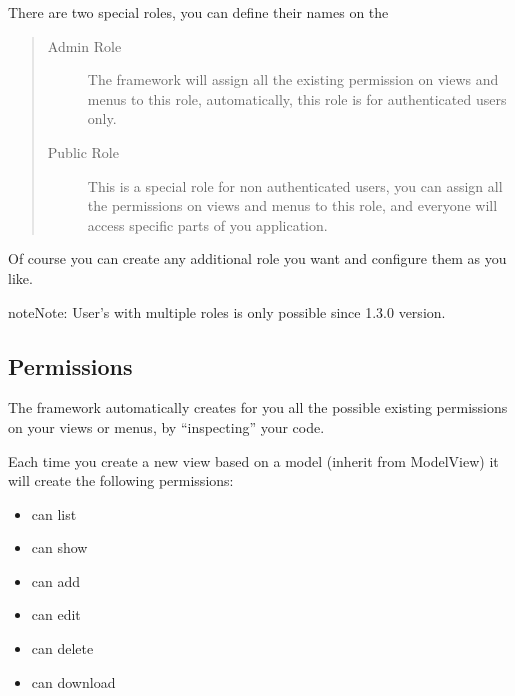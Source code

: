 \documentclass[letterpaper,10pt,english]{sphinxmanual}
\begin{document}
There are two special roles, you can define their names on the {\hyperref[config::doc]{}}
\begin{quote}\begin{description}
\item[{Admin Role}] \leavevmode
The framework will assign all the existing permission on views and menus to this role, automatically, this role is for authenticated users only.

\item[{Public Role}] \leavevmode
This is a special role for non authenticated users, you can assign all the permissions on views and menus to this role, and everyone will access specific parts of you application.

\end{description}\end{quote}

Of course you can create any additional role you want and configure them as you like.

\begin{notice}{note}{Note:}
User's with multiple roles is only possible since 1.3.0 version.
\end{notice}


\subsection{Permissions}
\label{security:permissions}
The framework automatically creates for you all the possible existing permissions on your views or menus, by ``inspecting'' your code.

Each time you create a new view based on a model (inherit from ModelView) it will create the following permissions:
\begin{itemize}
\item {} 
can list

\item {} 
can show

\item {} 
can add

\item {} 
can edit

\item {} 
can delete

\item {} 
can download

\end{itemize}
\end{document}
